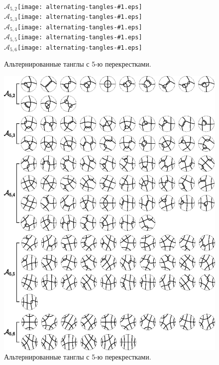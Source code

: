 \documentclass[12pt]{article}
\theoremstyle{plain}
\theoremstyle{definition}
\begin{document}
		\begin{figure}[ht]
			\centering
			\def\pic#1{\hbox{\protect\texttt{[image: alternating-tangles-\#1.eps]}}}

			$\mathcal A_{5,2}$\pic{11} \\
			$\mathcal A_{5,3}$\pic{12} \\
			$\mathcal A_{5,4}$\pic{13} \\
			$\mathcal A_{5,5}$\pic{14} \\
			$\mathcal A_{5,6}$\pic{15}

			\caption{\footnotesize Альтернированные танглы с 5-ю перекрестками.}
		\end{figure}

		\begin{figure}[ht]
			\centering
			\includegraphics[scale=0.8]{c/alternating-tangles-5.eps}
			\caption{\footnotesize Альтернированные танглы с 5-ю перекрестками.\label{figure:tangles5}}
		\end{figure}
\end{document}
